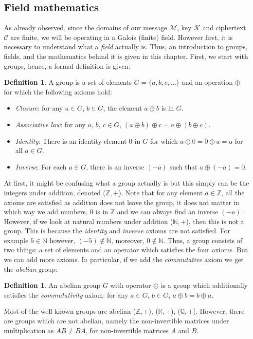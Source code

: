 \documentclass{Resources/UoBLab1}
\theoremstyle{definition}
\newtheorem{definition}[theorem]{Definition}
\begin{document}
\subsection{Field mathematics}\label{sub:field-maths}
As already observed, since the domains of our message $\mathcal{M}$, key $\mathcal{K}$ and ciphertext $\mathcal{C}$ are finite, we will be operating in a Galois (finite) field. However first, it is necessary to understand what a \textit{field} actually is. Thus, an introduction to groups, fields, and the mathematics behind it is given in this chapter. First, we start with groups, hence, a formal definition is given:
\begin{definition}
    A group is a set of elements $G = \{a, b, c, ...\}$ and an operation $\oplus$ for which the following axioms hold:
    \begin{itemize}
        \item \textit{Closure}: for any $a \in G$, $b \in G$, the element $a \oplus b$ is in $G$.
        \item \textit{Associative law}: for any $a$, $b$, $c \in G$, $(a \oplus b) \oplus c = a \oplus (b \oplus c)$.
        \item \textit{Identity}: There is an identity element $0$ in $G$ for which $a \oplus 0 = 0 \oplus a = a$ for all $a \in G$.
        \item \textit{Inverse}: For each $a \in G$, there is an inverse $(-a)$ such that $a \oplus (-a) = 0$.
    \end{itemize}
\end{definition}
At first, it might be confusing what a group actually is but this simply can be the integers under addition, denoted ($\mathbb{Z}, +$). Note that for any element $a \in \mathbb{Z}$, all the axioms are satisfied as addition does not leave the group, it does not matter in which way we add numbers, $0$ is in $\mathbb{Z}$ and we can always find an inverse $(-a)$. However, if we look at natural numbers under addition ($\mathbb{N}, +$), then this is not a group. This is because the \textit{identity} and \textit{inverse} axioms are not satisfied. For example $5 \in \mathbb{N}$ however, $(-5) \notin \mathbb{N}$, moreover, $0 \notin \mathbb{N}$. Thus, a group consists of two things: a set of elements and an operator which satisfies the four axioms. But we can add more axioms. In particular, if we add the \textit{commutative} axiom we get the \textit{abelian} group:
\begin{definition}
    An abelian group $G$ with operator $\oplus$ is a group which additionally satisfies the \textit{commutativity} axiom: for any $a \in G$, $b \in G$, $a \oplus b = b \oplus a$.
\end{definition}
Most of the well known groups are abelian ($\mathbb{Z}, +$), ($\mathbb{R}, +$), ($\mathbb{Q}, +$). However, there are groups which are not abelian, namely the non-invertible matrices under multiplication as $AB \ne BA$, for non-invertible matrices $A$ and $B$.
\end{document}
